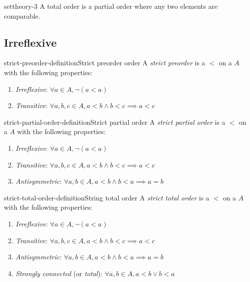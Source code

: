 \documentclass[preview]{standalone}
\begin{document}
\begin{snippet}{settheory-3}
    A total order is a partial order where any two elements are comparable.
\end{snippet}

\subsection{Irreflexive}

\begin{snippetdefinition}{strict-preorder-definition}{Strict preorder order}
    A \textit{strict preorder} is a \homrelation \(<\) on a \set \(A\)
    with the following properties:
    \begin{enumerate}
        \item \textit{Irreflexive}: \(\forall a \in A, \lnot (a < a)\)
        \item \textit{Transitive}: \(\forall a,b,c \in A, a < b \land b < c \implies a < c\)
    \end{enumerate}
\end{snippetdefinition}

\begin{snippetdefinition}{strict-partial-order-definition}{Strict partial order}
    A \textit{strict partial order} is a \homrelation \(<\) on a \set \(A\)
    with the following properties:
    \begin{enumerate}
        \item \textit{Irreflexive}: \(\forall a \in A, \lnot (a < a)\)
        \item \textit{Transitive}: \(\forall a,b,c \in A, a < b \land b < c \implies a < c\)
        \item \textit{Antisymmetric}: \(\forall a,b \in A, a < b \land b < a \implies a=b\)
    \end{enumerate}
\end{snippetdefinition}

\begin{snippetdefinition}{strict-total-order-definition}{String total order}
    A \textit{strict total order} is a \homrelation \(<\) on a \set \(A\)
    with the following properties:
    
    \begin{enumerate}
        \item \textit{Irreflexive}: \(\forall a \in A, \lnot (a < a)\)
        \item \textit{Transitive}: \(\forall a,b,c \in A, a < b \land b < c \implies a < c\)
        \item \textit{Antisymmetric}: \(\forall a,b \in A, a < b \land b < a \implies a=b\)
        \item \textit{Strongly connected} (or \textit{total}): \(\forall a,b\in A, a < b \lor b < a\)
    \end{enumerate}
\end{snippetdefinition}
\end{document}
